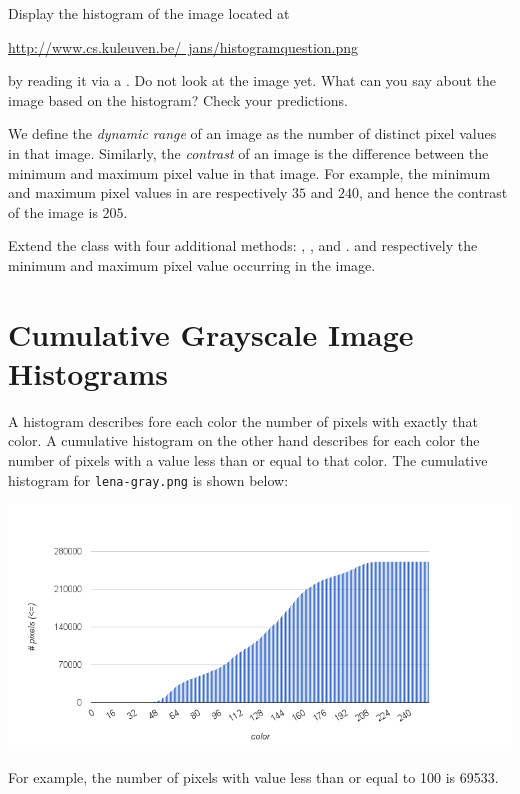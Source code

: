 \documentclass{book}
\begin{document}
\begin{exercise}
Display the histogram of the image located at

 \href{http://www.cs.kuleuven.be/~jans/histogramquestion.png}{http://www.cs.kuleuven.be/~jans/histogramquestion.png} 
 
by reading it via a . Do not look at the image yet. What can you say about the image based on the histogram? Check your predictions. 
\end{exercise}

We define the \emph{dynamic range} of an image as the number of distinct pixel values in that image. Similarly, the \emph{contrast} of an image is the difference between the minimum and maximum pixel value in that image. For example, the minimum and maximum pixel values in  are respectively $35$ and $240$, and hence the contrast of the image is $205$.

\begin{exercise}
Extend the class  with four additional methods: , ,  and .  and  respectively the minimum and maximum pixel value occurring in the image. 
\end{exercise}

\section{Cumulative Grayscale Image Histograms}
A histogram describes fore each color the number of pixels with exactly that color. A cumulative histogram on the other hand describes for each color the number of pixels with a value less than or equal to that color. The cumulative histogram for \texttt{lena-gray.png} is shown below:
\begin{center}
\includegraphics[scale=0.5]{lena-gray-cumulative-histogram.png}
\end{center}
For example, the number of pixels with value less than or equal to 100 is 69533.
\end{document}
